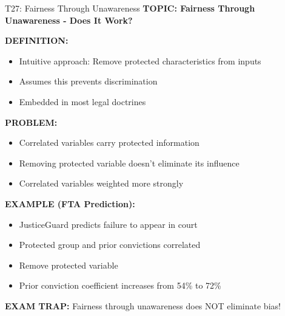 \documentclass[8pt]{beamer}
\begin{document}
	\begin{frame}{T27: Fairness Through Unawareness}
		\fontsize{6.5}{7.5}\selectfont
		\textbf{TOPIC: Fairness Through Unawareness - Does It Work?}
		
		\vspace{0.1cm}
		\textbf{DEFINITION:}
		\begin{itemize}
			\item Intuitive approach: Remove protected characteristics from inputs
			\item Assumes this prevents discrimination
			\item Embedded in most legal doctrines
		\end{itemize}
		
		\vspace{0.1cm}
		\textbf{PROBLEM:}
		\begin{itemize}
			\item Correlated variables carry protected information
			\item Removing protected variable doesn't eliminate its influence
			\item Correlated variables weighted more strongly
		\end{itemize}
		
		\vspace{0.1cm}
		\textbf{EXAMPLE (FTA Prediction):}
		\begin{itemize}
			\item JusticeGuard predicts failure to appear in court
			\item Protected group and prior convictions correlated
			\item Remove protected variable
			\item Prior conviction coefficient increases from 54\% to 72\%
		\end{itemize}
		
		\textcolor{myred}{\textbf{EXAM TRAP:}} Fairness through unawareness \textcolor{myblue}{does NOT eliminate bias}!
	\end{frame}
	
\end{document}
